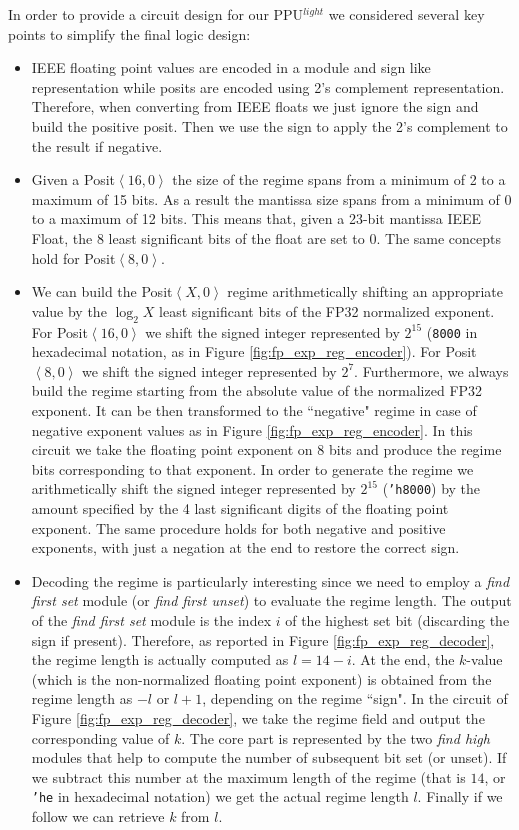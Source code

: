 In order to provide a circuit design for our PPU$^{light}$ we considered several key points to simplify the final logic design:
\begin{itemize}
    \item IEEE floating point values are encoded in a module and sign like representation while posits are encoded using 2's complement representation. Therefore, when converting from IEEE floats we just ignore the sign and build the positive posit. Then we use the sign to apply the 2's complement to the result if negative.
    \item Given a Posit$\left<16,0\right>$ the size of the regime spans from a minimum of 2 to a maximum of 15 bits. As a result the mantissa size spans from a minimum of 0 to a maximum of 12 bits. This means that, given a 23-bit mantissa IEEE Float, the 8 least significant bits of the float are set to 0. The same concepts hold for Posit$\left<8,0\right>$. 
    \item We can build the Posit$\left<X,0\right>$ regime arithmetically shifting an appropriate value by the $\log_2{X}$ least significant bits of the FP32 normalized exponent. For Posit$\left<16,0\right>$ we shift the signed integer represented by $2^{15}$ (\texttt{8000} in hexadecimal notation, as in Figure \ref{fig:fp_exp_reg_encoder}). For Posit$\left<8,0\right>$ we shift the signed integer represented by $2^{7}$. Furthermore, we always build the regime starting from the absolute value of the normalized FP32 exponent. It can be then transformed to the ``negative" regime in case of negative exponent values as in Figure \ref{fig:fp_exp_reg_encoder}. In this circuit we take the floating point exponent on 8 bits and produce the regime bits corresponding to that exponent. In order to generate the regime we arithmetically shift the signed integer represented by $2^{15}$ (\texttt{'h8000}) by the amount specified by the 4 last significant digits of the floating point exponent. The same procedure holds for both negative and positive exponents, with just a negation at the end to restore the correct sign. 
    \item Decoding the regime is particularly interesting since we need to employ a \emph{find first set} module (or \emph{find first unset}) to evaluate the regime length. The output of the \emph{find first set} module is the index $i$ of the highest set bit (discarding the sign if present). Therefore, as reported in Figure \ref{fig:fp_exp_reg_decoder}, the regime length is actually computed as $l=14-i$. At the end, the $k$-value (which is the non-normalized floating point exponent) is obtained from the regime length as $-l$ or $l+1$, depending on the regime ``sign". In the circuit of Figure \ref{fig:fp_exp_reg_decoder}, we take the regime field and output the corresponding value of $k$. The core part is represented by the two \textit{find high} modules that help to compute the number of subsequent bit set (or unset). If we subtract this number at the maximum length of the regime (that is $14$, or \texttt{'he} in hexadecimal notation) we get the actual regime length $l$. Finally if we follow we can retrieve $k$ from $l$.  
\end{itemize}

